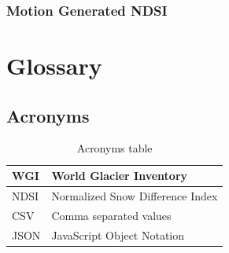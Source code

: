 \documentclass[11pt, a4paper]{report}
\begin{document}

	\subsection{Motion Generated NDSI}
	\label{seq:motion_ndsi_implementation}
	
	\tableofcontents{}
	\listoffigures{}
	\listoftables{}
	
	
	
		
	\chapter{Glossary}
	
	
	\section{Acronyms}
	
		\begin{table} [H]
		\centering
		\begin{tabular} {|  l | L{10cm} |}
			\hline
			WGI & World Glacier Inventory \\ [0.2ex]
			\hline
			NDSI & Normalized Snow Difference Index \\ [0.2ex]
			\hline
			\hline
			CSV & Comma separated values \\ [0.2ex]
			\hline
			\hline
			JSON & JavaScript Object Notation \\ [0.2ex]
			\hline
		\end{tabular}
		\caption{Acronyms table }
		\label{table:acron}
	\end{table}
	
\end{document}
